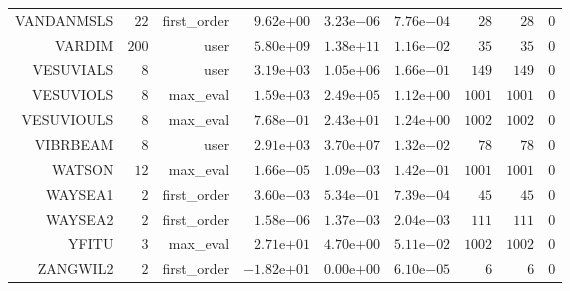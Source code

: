 \begin{longtable}{rrrrrrrrr}
VANDANMSLS & \(    22\) & first\_order & \( 9.62\)e\(+00\) & \( 3.23\)e\(-06\) & \( 7.76\)e\(-04\) & \(    28\) & \(    28\) & \(     0\) \\
VARDIM & \(   200\) & user & \( 5.80\)e\(+09\) & \( 1.38\)e\(+11\) & \( 1.16\)e\(-02\) & \(    35\) & \(    35\) & \(     0\) \\
VESUVIALS & \(     8\) & user & \( 3.19\)e\(+03\) & \( 1.05\)e\(+06\) & \( 1.66\)e\(-01\) & \(   149\) & \(   149\) & \(     0\) \\
VESUVIOLS & \(     8\) & max\_eval & \( 1.59\)e\(+03\) & \( 2.49\)e\(+05\) & \( 1.12\)e\(+00\) & \(  1001\) & \(  1001\) & \(     0\) \\
VESUVIOULS & \(     8\) & max\_eval & \( 7.68\)e\(-01\) & \( 2.43\)e\(+01\) & \( 1.24\)e\(+00\) & \(  1002\) & \(  1002\) & \(     0\) \\
VIBRBEAM & \(     8\) & user & \( 2.91\)e\(+03\) & \( 3.70\)e\(+07\) & \( 1.32\)e\(-02\) & \(    78\) & \(    78\) & \(     0\) \\
WATSON & \(    12\) & max\_eval & \( 1.66\)e\(-05\) & \( 1.09\)e\(-03\) & \( 1.42\)e\(-01\) & \(  1001\) & \(  1001\) & \(     0\) \\
WAYSEA1 & \(     2\) & first\_order & \( 3.60\)e\(-03\) & \( 5.34\)e\(-01\) & \( 7.39\)e\(-04\) & \(    45\) & \(    45\) & \(     0\) \\
WAYSEA2 & \(     2\) & first\_order & \( 1.58\)e\(-06\) & \( 1.37\)e\(-03\) & \( 2.04\)e\(-03\) & \(   111\) & \(   111\) & \(     0\) \\
YFITU & \(     3\) & max\_eval & \( 2.71\)e\(+01\) & \( 4.70\)e\(+00\) & \( 5.11\)e\(-02\) & \(  1002\) & \(  1002\) & \(     0\) \\
ZANGWIL2 & \(     2\) & first\_order & \(-1.82\)e\(+01\) & \( 0.00\)e\(+00\) & \( 6.10\)e\(-05\) & \(     6\) & \(     6\) & \(     0\) \\\hline
\end{longtable}
